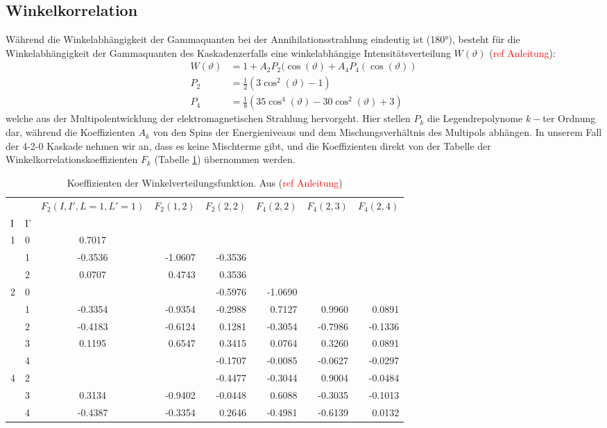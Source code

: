 \documentclass[%
aps,
onecolumn,
11pt,
tightenlines,
nofootinbib,
superscriptaddress,
floatfix,
prd,
]{revtex4-2}
\begin{document}
\subsection{Winkelkorrelation}
\label{sec:Winkelkorrelation}
Während die Winkelabhängigkeit der Gammaquanten bei der Annihilationsstrahlung eindeutig ist (180°), besteht für die Winkelabhängigkeit der Gammaquanten des Kaskadenzerfalls eine winkelabhängige Intensitätsverteilung $W(\vartheta)$ (\textcolor{red}{ref Anleitung}):
\begin{align}
	W(\vartheta) &= 1 + A_2 P_2(\cos (\vartheta) + A_4 P_4(\cos (\vartheta)) \\
    P_2          &= \frac{1}{2}\left(3\cos^2(\vartheta) - 1 \right) \nonumber \\
    P_4          &= \frac{1}{8}\left(35\cos^4(\vartheta) - 30\cos^2(\vartheta) + 3 \right) \nonumber
\end{align}
welche aus der Multipolentwicklung der elektromagnetischen Strahlung hervorgeht. Hier stellen $P_k$ die Legendrepolynome $k-$ter Ordnung dar, während die Koeffizienten $A_k$ von den Spins der Energieniveaus und dem Mischungsverhältnis des Multipols abhängen. In unserem Fall der 4-2-0 Kaskade nehmen wir an, dass es keine Mischterme gibt, und die Koeffizienten direkt von der Tabelle der Winkelkorrelationskoeffizienten $F_k$ (Tabelle \ref{tab:angularcorrelationcoefficient}) übernommen werden.
\begin{table}[ht]
\begin{tabular}{llcrrrrr}
\toprule
 &  & $F_2(I,I',L=1, L'=1)$ & $F_2(1,2)$  & $F_2(2,2)$  & $F_4(2,2)$ & $F_4(2,3)$  & $F_4(2,4)$ \\
I & I’ &  &  &  &  &  &  \\
\midrule
\multirow[t]{3}{*}{1} & 0 & 0.7017 &  &  &  &  &  \\
 & 1 & -0.3536 & -1.0607 & -0.3536 &  &  &  \\
 & 2 & 0.0707 & 0.4743 & 0.3536 &  &  &  \\
\cline{1-8}
\multirow[t]{3}{*}{2} & 0 &  &  & -0.5976 & -1.0690 &  &  \\
 & 1 & -0.3354 & -0.9354 & -0.2988 & 0.7127 & 0.9960 & 0.0891 \\
 & 2 & -0.4183 & -0.6124 & 0.1281 & -0.3054 & -0.7986 & -0.1336 \\
 & 3 & 0.1195 & 0.6547 & 0.3415 & 0.0764 & 0.3260 & 0.0891 \\
 & 4 &  &  & -0.1707 & -0.0085 & -0.0627 & -0.0297 \\
\cline{1-8}
\multirow[t]{3}{*}{4} & 2 &  &  & -0.4477 & -0.3044 & 0.9004 & -0.0484 \\
 & 3 & 0.3134 & -0.9402 & -0.0448 & 0.6088 & -0.3035 & -0.1013 \\
 & 4 & -0.4387 & -0.3354 & 0.2646 & -0.4981 & -0.6139 & 0.0132 \\
\cline{1-8}
\bottomrule
\end{tabular}
\caption{Koeffizienten der Winkelverteilungsfunktion. Aus (\textcolor{red}{ref Anleitung})}
\label{tab:angularcorrelationcoefficient}
\end{table} \\
\end{document}
